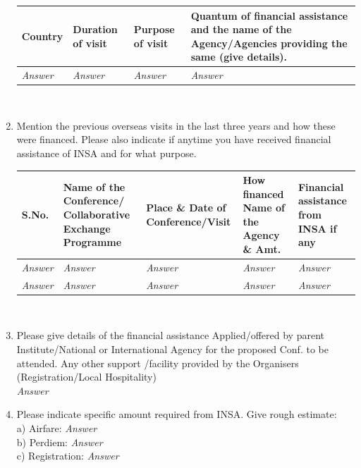 \documentclass[12pt,a4paper]{article}
\begin{document}
\begin{enumerate}
		\begin{tabular}{p{2cm}p{2cm}p{2cm}p{7cm}}
			\hline
			Country		&Duration of visit	&Purpose of visit		&Quantum of financial assistance and the name of the Agency/Agencies providing the same (give details).\\
			\hline
			\textit{Answer}		& \textit{Answer}					&\textit{Answer}						&\textit{Answer}   \\[.5cm]
			\hline
		\end{tabular}
			\\[1em]

	\item Mention the previous overseas visits in the last three 
		  years and how these were financed. Please also indicate 
		  if anytime you have received financial assistance of INSA 
		  and	for what purpose.\\[1em]
		  
		\begin{tabular}{p{.8cm}p{4cm}p{3cm}p{3cm}p{2cm}}
			\hline
			S.No. 	
			&Name of the Conference/ Collaborative Exchange Programme 	
			&Place \& Date of Conference/Visit
			&How financed Name of the Agency \& Amt. 	
			&Financial assistance from INSA if any\\
			\hline
			\textit{Answer}		&\textit{Answer}	&\textit{Answer}	&\textit{Answer} &\textit{Answer}
			\\
			\textit{Answer}		&\textit{Answer}	&\textit{Answer}	&\textit{Answer} &\textit{Answer}
			\\
			\hline
		\end{tabular}
		\\[1em]
	\item Please give details of the financial assistance Applied/offered 
		  by parent Institute/National or International Agency for 
		  the proposed Conf. to be attended. 
		  Any other support /facility provided by the Organisers 
		  (Registration/Local Hospitality)\\[1em]
		 \textit{Answer}		
	
	\item Please indicate specific amount required from INSA. Give rough estimate: \\[.5cm]
		  	a)  Airfare: \textit{Answer}		\\[.5cm]
			b)  Perdiem: \textit{Answer}		\\[.5cm]			
			c)  Registration: \textit{Answer}			
\end{enumerate}

\vspace*{1.5cm}
\end{document}
